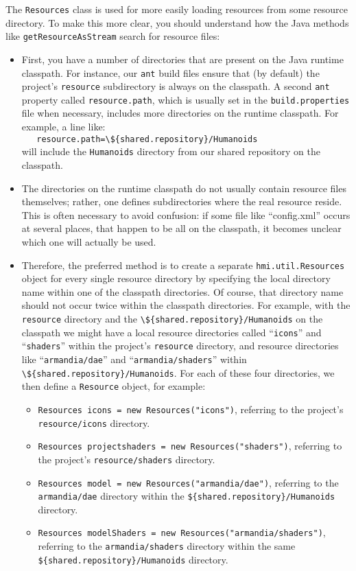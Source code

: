 The \verb#Resources# class is used for more easily loading resources from some resource directory.
To make this more clear, you should understand how the Java methods like \verb#getResourceAsStream# search for resource files:
\begin{itemize}
\item First, you have a number of directories that are present on the Java runtime classpath. For instance, our \verb#ant# build files
ensure that (by default) the project's \verb#resource# subdirectory is always on the classpath.
A second \verb#ant# property called \verb#resource.path#, which is usually set in the \verb#build.properties# file when necessary,
includes more directories on the runtime classpath. For example, a line like:\\
\verb#   resource.path=\${shared.repository}/Humanoids#\\
will include the \verb#Humanoids# directory from our shared repository on the classpath.
\item The directories on the runtime classpath do not usually contain resource files themselves;
rather, one defines subdirectories where the real resource reside. This is often necessary to avoid confusion: if some
file like ``config.xml'' occurs at several places, that happen to be all on the classpath, it becomes unclear
which one will actually be used. 
\item Therefore, the preferred method is to create a separate \verb#hmi.util.Resources# object for every single resource directory
by specifying the local directory name within one of the classpath directories. 
Of course, that directory name should not occur twice within the classpath directories. 
 For example, with  the \verb#resource# directory and the  \verb#\${shared.repository}/Humanoids# on the classpath
 we might have a local resource directories called  ``\verb#icons#'' and ``\verb#shaders#''
  within the project's \verb#resource# directory, and resource directories like  ``\verb#armandia/dae#'' and
  ``\verb#armandia/shaders#'' within \\ \verb#\${shared.repository}/Humanoids#.
  For each of these four directories, we then define a \verb#Resource# object, for example:
  \begin{itemize}
  \item \verb#Resources icons = new Resources("icons")#, referring to the project's \verb#resource/icons# directory.
  \item \verb#Resources projectshaders = new Resources("shaders")#, referring to the project's \verb#resource/shaders# directory.
  \item \verb#Resources model = new Resources("armandia/dae")#, referring to the \verb#armandia/dae# directory within
  the \verb#${shared.repository}/Humanoids# directory.
  \item \verb#Resources modelShaders = new Resources("armandia/shaders")#, referring to the \verb#armandia/shaders# directory within
  the same \\ \verb#${shared.repository}/Humanoids# directory.
  \end{itemize}
\end{itemize}

